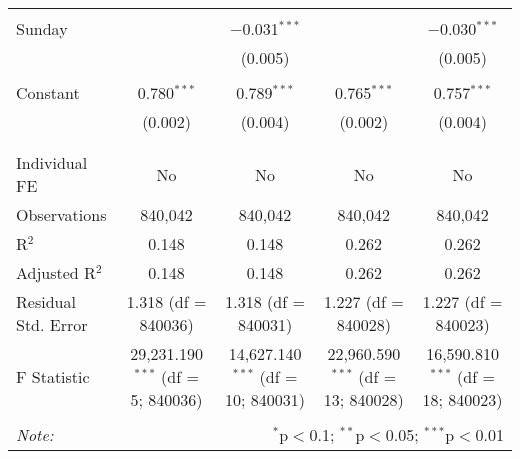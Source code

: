 \documentclass[
]{article}
\begin{document}
\begin{table}[!htbp]
{\begin{tabular}{@{\extracolsep{5pt}}lcccc}
  & & & & \\ 
 Sunday &  & $-$0.031$^{***}$ &  & $-$0.030$^{***}$ \\ 
  &  & (0.005) &  & (0.005) \\ 
  & & & & \\ 
 Constant & 0.780$^{***}$ & 0.789$^{***}$ & 0.765$^{***}$ & 0.757$^{***}$ \\ 
  & (0.002) & (0.004) & (0.002) & (0.004) \\ 
  & & & & \\ 
\hline \\[-1.8ex] 
Individual FE & No & No & No & No \\ 
Observations & 840,042 & 840,042 & 840,042 & 840,042 \\ 
R$^{2}$ & 0.148 & 0.148 & 0.262 & 0.262 \\ 
Adjusted R$^{2}$ & 0.148 & 0.148 & 0.262 & 0.262 \\ 
Residual Std. Error & 1.318 (df = 840036) & 1.318 (df = 840031) & 1.227 (df = 840028) & 1.227 (df = 840023) \\ 
F Statistic & 29,231.190$^{***}$ (df = 5; 840036) & 14,627.140$^{***}$ (df = 10; 840031) & 22,960.590$^{***}$ (df = 13; 840028) & 16,590.810$^{***}$ (df = 18; 840023) \\ 
\hline 
\hline \\[-1.8ex] 
\textit{Note:}  & \multicolumn{4}{r}{$^{*}$p$<$0.1; $^{**}$p$<$0.05; $^{***}$p$<$0.01} \\ 
\end{tabular}
} 
\end{table} 
\newpage
\end{document}
